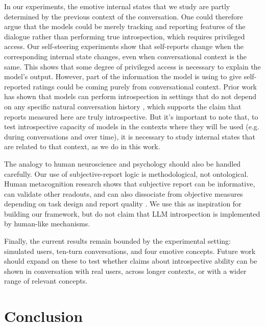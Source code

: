 \documentclass[10pt]{article}
\begin{document}
In our experiments, the emotive internal states that we study are partly determined by the previous context of the conversation. One could therefore argue that the models could be merely tracking and reporting features of the dialogue rather than performing true introspection, which requires privileged access. Our self-steering experiments show that self-reports change when the corresponding internal state changes, even when conversational context is the same. This shows that some degree of privileged access is necessary to explain the model's output. However, part of the information the model is using to give self-reported ratings could be coming purely from conversational context. Prior work has shown that models can perform introspection in settings that do not depend on any specific natural conversation history \citep{Lindsey2026, PearsonVogel2026, JiAn2025}, which supports the claim that reports measured here are truly introspective. But it's important to note that, to test introspective capacity of models in the contexts where they will be used (e.g. during conversations and over time), it is necessary to study internal states that are related to that context, as we do in this work.

The analogy to human neuroscience and psychology should also be handled carefully.
Our use of subjective-report logic is methodological, not ontological.
Human metacognition research shows that subjective report can be informative, can validate other readouts, and can also dissociate from objective measures depending on task design and report quality \citep{FlemingLau2014, Lapate2020, KieferKammer2024}.
We use this as inspiration for building our framework, but do not claim that LLM introspection is implemented by human-like mechanisms.

Finally, the current results remain bounded by the experimental setting: simulated users, ten-turn conversations, and four emotive concepts. Future work should expand on these to test whether claims about introspective ability can be shown in conversation with real users, across longer contexts, or with a wider range of relevant concepts.

\section{Conclusion}
\label{sec:conclusion}
\end{document}
